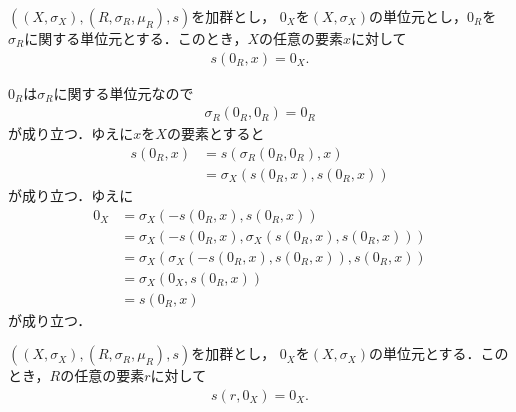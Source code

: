 	\begin{screen}
		\begin{thm}[$0$倍すればゼロ]\label{thm:zero_multiplication_is_zero}
			$\left((X,\sigma_X),(R,\sigma_R,\mu_R),s\right)$を加群とし，
			$0_X$を$(X,\sigma_X)$の単位元とし，$0_R$を$\sigma_R$に関する単位元とする．このとき，$X$の任意の要素$x$に対して
			\begin{align}
				s\left(0_R,x\right) = 0_X.
			\end{align}
		\end{thm}
	\end{screen}
	
	\begin{sketch}
		$0_R$は$\sigma_R$に関する単位元なので
		\begin{align}
			\sigma_R\left(0_R,0_R\right) = 0_R
		\end{align}
		が成り立つ．ゆえに$x$を$X$の要素とすると
		\begin{align}
			s\left(0_R,x\right) &= s\left(\sigma_R\left(0_R,0_R\right),x\right) \\
			&= \sigma_X\left(s\left(0_R,x\right),s\left(0_R,x\right)\right)
		\end{align}
		が成り立つ．ゆえに
		\begin{align}
			0_X &= \sigma_X\left(-s\left(0_R,x\right),s\left(0_R,x\right)\right) \\
			&= \sigma_X\left(-s\left(0_R,x\right),\sigma_X\left(s\left(0_R,x\right),s\left(0_R,x\right)\right)\right) \\
			&= \sigma_X\left(\sigma_X\left(-s\left(0_R,x\right),s\left(0_R,x\right)\right),s\left(0_R,x\right)\right) \\
			&= \sigma_X\left(0_X,s\left(0_R,x\right)\right) \\
			&= s\left(0_R,x\right)
		\end{align}
		が成り立つ．
		\QED
	\end{sketch}
	
	\begin{screen}
		\begin{thm}[ゼロには何を掛けてもゼロ]\label{thm:zero_multiplied_is_zero}
			$\left((X,\sigma_X),(R,\sigma_R,\mu_R),s\right)$を加群とし，
			$0_X$を$(X,\sigma_X)$の単位元とする．このとき，$R$の任意の要素$r$に対して
			\begin{align}
				s\left(r,0_X\right) = 0_X.
			\end{align}
		\end{thm}
	\end{screen}
	
